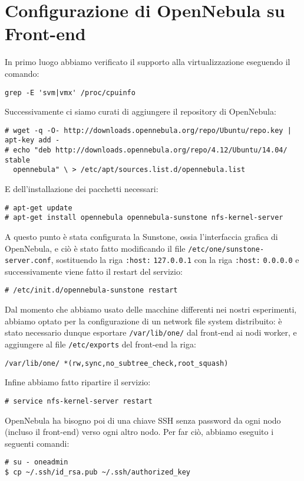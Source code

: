\documentclass[twoside]{article}
\begin{document}
\section{Configurazione di OpenNebula su Front-end}
In primo luogo abbiamo verificato il supporto alla virtualizzazione eseguendo il comando:
\begin{lstlisting}[frame=trBL]
grep -E 'svm|vmx' /proc/cpuinfo
\end{lstlisting}

Successivamente ci siamo curati di aggiungere il repository di OpenNebula:
\begin{lstlisting}[frame=trBL]
# wget -q -O- http://downloads.opennebula.org/repo/Ubuntu/repo.key | apt-key add -
# echo "deb http://downloads.opennebula.org/repo/4.12/Ubuntu/14.04/ stable 
  opennebula" \ > /etc/apt/sources.list.d/opennebula.list
\end{lstlisting}

E dell'installazione dei pacchetti necessari:
\begin{lstlisting}[frame=trBL]
# apt-get update
# apt-get install opennebula opennebula-sunstone nfs-kernel-server
\end{lstlisting}

A questo punto è stata configurata la Sunstone, ossia l'interfaccia grafica di OpenNebula,
e ciò è stato fatto modificando il file 
\texttt{/etc/one/sunstone-server.conf}, sostituendo la riga \texttt{:host:} \texttt{127.0.0.1}
con la riga \texttt{:host:} \texttt{0.0.0.0} e successivamente viene fatto il restart del servizio:
\begin{lstlisting}[frame=trBL]
# /etc/init.d/opennebula-sunstone restart
\end{lstlisting}

Dal momento che abbiamo usato delle macchine differenti nei nostri esperimenti, abbiamo optato
per la configurazione di un network file system distribuito: è stato necessario dunque esportare
\texttt{/var/lib/one/} dal front-end ai nodi worker, e aggiungere al file \texttt{/etc/exports}
del front-end la riga:
\begin{lstlisting}[frame=trBL]
/var/lib/one/ *(rw,sync,no_subtree_check,root_squash)
\end{lstlisting}

Infine abbiamo fatto ripartire il servizio:
\begin{lstlisting}[frame=trBL]
# service nfs-kernel-server restart
\end{lstlisting}

OpenNebula ha bisogno poi di una chiave SSH senza password da ogni nodo (incluso il front-end)
verso ogni altro nodo. Per far ciò, abbiamo eseguito i seguenti comandi:
\begin{lstlisting}[frame=trBL]
# su - oneadmin
$ cp ~/.ssh/id_rsa.pub ~/.ssh/authorized_key
\end{lstlisting}
\end{document}
